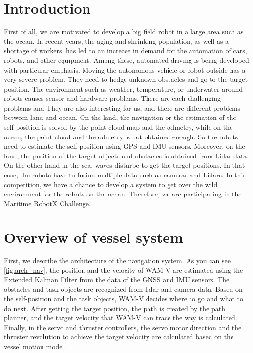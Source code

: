 \documentclass[lettersize,journal]{IEEEtran}
\begin{document}
\section{Introduction}
First of all, we are motivated to develop a big field robot in a large area such as the ocean.
In recent years, the aging and shrinking population, as well as a shortage of workers,
has led to an increase in demand for the automation of cars, robots, and other equipment.
Among these, automated driving is being developed with particular emphasis.
Moving the autonomous vehicle or robot outside has a very severe problem.
They need to hedge unknown obstacles and go to the target position.
The environment such as weather, temperature, or underwater around robots causes sensor and hardware problems.
There are each challenging problems and They are also interesting for us, and there are different problems between land and ocean.
On the land, the navigation or the estimation of the self-position is solved by the point cloud map and the odmetry,
while on the ocean, the point cloud and the odmetry is not obtained enough. So the robots need to estimate the self-position using GPS and IMU sensors.
Moreover, on the land, the position of the target objects and obstacles is obtained from Lidar data. On the other hand in the sea,
waves disturbe to get the target positions. In that case, the robots have to fusion multiple data such as cameras and Lidars.
In this competition, we have a chance to develop a system to get over the wild environment 
for the robots on the ocean. Therefore, we are participating in the Maritime RobotX Challenge.

\section{Overview of vessel system}
First, we describe the architecture of the navigation system. As you can see \ref{fig:arch_nav},
the position and the velocity of WAM-V are estimated using the Extended Kalman Filter from the data of the GNSS and IMU sensors.
The obstacles and task objects are recognized from lidar and camera data. Based on the self-position and the task objects, 
WAM-V decides where to go and what to do next.
After getting the target position, the path is created by the path planner,
and the target velocity that WAM-V can trace the way is calculated. 
Finally, in the servo and thruster controllers,
the servo motor direction and the thruster revolution to achieve the target velocity are calculated based on the vessel motion model.
\end{document}

